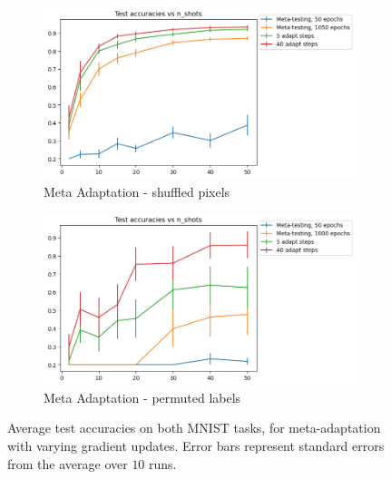 \documentclass{article} %
\theoremstyle{definition}
\begin{document}
\begin{figure}[h!]
	\centering
	\begin{subfigure}[b]{0.49\textwidth}
		\centering
		\includegraphics[width=\textwidth]{test_accuracies_pixels_const}
		\caption{Meta Adaptation - shuffled pixels}
	\end{subfigure}
	\hfill
	\begin{subfigure}[b]{0.49\textwidth}
		\centering
		\includegraphics[width=\textwidth]{test_accuracies_labels_const}
		\caption{Meta Adaptation - permuted labels}	 	
	\end{subfigure}
	\hfill
	\caption{Average test accuracies on both MNIST tasks, for meta-adaptation with varying gradient updates. Error bars represent standard errors from the average over $10$ runs.}	 
	\label{fig:results-pixels}
\end{figure}
\end{document}
